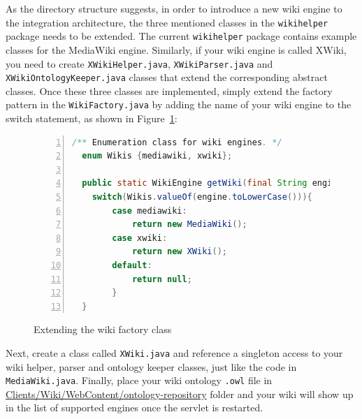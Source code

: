 As the directory structure suggests, in order to introduce a new wiki engine to the integration architecture, the three mentioned classes in the \texttt{wikihelper} package needs to be extended. The current \texttt{wikihelper} package contains example classes for the MediaWiki engine. Similarly, if your wiki engine is called XWiki, you need to create \texttt{XWikiHelper.java}, \texttt{XWikiParser.java} and \texttt{XWikiOntologyKeeper.java} classes that extend the corresponding abstract classes. Once these three classes are implemented, simply extend the factory pattern in the \texttt{WikiFactory.java} by adding the name of your wiki engine to the switch statement, as shown in Figure~\ref{list:wiki_factory_extend}:

\begin{figure}[h!]
\centering
\begin{lstlisting}[language=Java,numbers=left,xleftmargin=4mm,columns=flexible]
  /** Enumeration class for wiki engines. */
  enum Wikis {mediawiki, xwiki};

  public static WikiEngine getWiki(final String engine){
    switch(Wikis.valueOf(engine.toLowerCase())){
		case mediawiki:
			return new MediaWiki();
		case xwiki:
			return new XWiki();
		default:
			return null;
		}
  }
\end{lstlisting}
\caption{Extending the wiki factory class}
\label{list:wiki_factory_extend}
\end{figure}

Next, create a class called \texttt{XWiki.java} and reference a singleton access to your wiki helper, parser and ontology keeper classes, just like the code in \texttt{MediaWiki.java}. Finally, place your wiki ontology \texttt{.owl} file in \url{Clients/Wiki/WebContent/ontology-repository} folder and your wiki will show up in the list of supported engines once the servlet is restarted.
